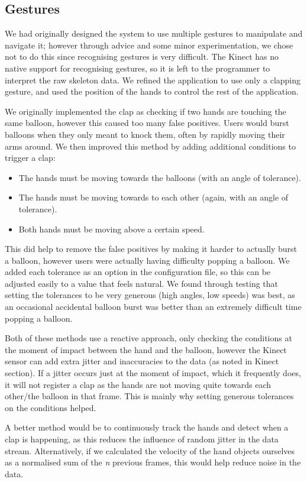 \clearpage{}
\subsection{Gestures}

We had originally designed the system to use multiple gestures to manipulate and navigate it; however through advice and some minor experimentation, we chose not to do this since recognising gestures is very difficult.
The Kinect has no native support for recognising gestures, so it is left to the programmer to interpret the raw skeleton data.
We refined the application to use only a clapping gesture, and used the position of the hands to control the rest of the application.

We originally implemented the clap as checking if two hands are touching the same balloon, however this caused too many false positives.
Users would burst balloons when they only meant to knock them, often by rapidly moving their arms around.
We then improved this method by adding additional conditions to trigger a clap:

\begin{itemize}
\item{The hands must be moving towards the balloons (with an angle of tolerance).}
\item{The hands must be moving towards to each other (again, with an angle of tolerance).}
\item{Both hands must be moving above a certain speed.}
\end{itemize}

This did help to remove the false positives by making it harder to actually burst a balloon, however users were actually having difficulty popping a balloon.
We added each tolerance as an option in the configuration file, so this can be adjusted easily to a value that feels natural.
We found through testing that setting the tolerances to be very generous (high angles, low speeds) was best, as an occasional accidental balloon burst was better than an extremely difficult time popping a balloon.

Both of these methods use a reactive approach, only checking the conditions at the moment of impact between the hand and the balloon, however the Kinect sensor can add extra jitter and inaccuracies to the data (as noted in Kinect section).
If a jitter occurs just at the moment of impact, which it frequently does, it will not register a clap as the hands are not moving quite towards each other/the balloon in that frame.
This is mainly why setting generous tolerances on the conditions helped.

A better method would be to continuously track the hands and detect when a clap is happening, as this reduces the influence of random jitter in the data stream.
Alternatively, if we calculated the velocity of the hand objects ourselves as a normalised sum of the \textit{n} previous frames, this would help reduce noise in the data.
